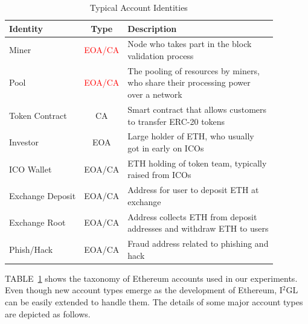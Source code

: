 \begin{table}[t]
\caption{Typical Account Identities}
\begin{center}
\begin{tabular}{|l|c|l|}
\hline
\textbf{Identity} & \textbf{Type}& \textbf{Description} \\
\hline
Miner & \textcolor{red}{EOA/CA} & \tabincell{l}{Node who takes part in the block \\validation process} \\ \hline
Pool & \textcolor{red}{EOA/CA} & \tabincell{l}{The pooling of resources by miners, \\who share their processing power \\over a network}\\ \hline
Token Contract & CA & \tabincell{l}{Smart contract that allows customers \\to transfer ERC-20 tokens} \\ \hline
Investor & EOA & \tabincell{l}{Large holder of ETH, who usually \\got in early on ICOs} \\ \hline
ICO Wallet & EOA/CA & \tabincell{l}{ETH holding of token team, typically \\raised from ICOs} \\ \hline
Exchange Deposit & EOA/CA & \tabincell{l}{Address for user to deposit ETH at \\exchange} \\ \hline
Exchange Root & EOA/CA & \tabincell{l}{Address collects ETH from deposit \\addresses and withdraw ETH to users} \\ \hline
Phish/Hack & EOA/CA & \tabincell{l}{Fraud address related to phishing and \\hack} \\ \hline
\end{tabular}
\label{table:identity}
\end{center}
\end{table}

TABLE~\ref{table:identity} shows the taxonomy of Ethereum accounts used in our experiments. Even though new account types emerge as the development of Ethereum, I$^2$GL can be easily extended to handle them. The details of some major account types are depicted as follows.

